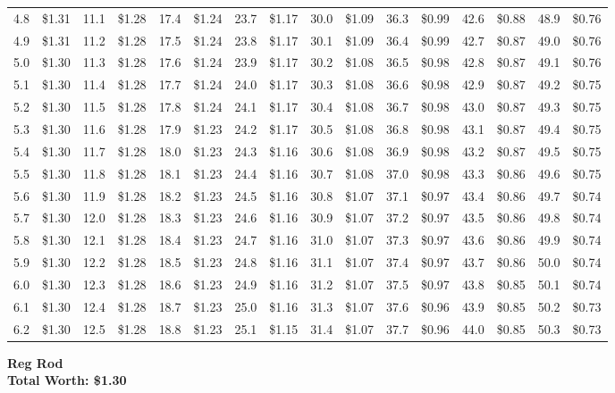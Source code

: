 \documentclass{article}
\begin{document}
\begin{tabular}{|*{8}{rr|}}
4.8 & \$1.31 & 11.1 & \$1.28 & 17.4 & \$1.24 & 23.7 & \$1.17 & 30.0 & \$1.09 & 36.3 & \$0.99 & 42.6 & \$0.88 & 48.9 & \$0.76\\
4.9 & \$1.31 & 11.2 & \$1.28 & 17.5 & \$1.24 & 23.8 & \$1.17 & 30.1 & \$1.09 & 36.4 & \$0.99 & 42.7 & \$0.87 & 49.0 & \$0.76\\
5.0 & \$1.30 & 11.3 & \$1.28 & 17.6 & \$1.24 & 23.9 & \$1.17 & 30.2 & \$1.08 & 36.5 & \$0.98 & 42.8 & \$0.87 & 49.1 & \$0.76\\
5.1 & \$1.30 & 11.4 & \$1.28 & 17.7 & \$1.24 & 24.0 & \$1.17 & 30.3 & \$1.08 & 36.6 & \$0.98 & 42.9 & \$0.87 & 49.2 & \$0.75\\
5.2 & \$1.30 & 11.5 & \$1.28 & 17.8 & \$1.24 & 24.1 & \$1.17 & 30.4 & \$1.08 & 36.7 & \$0.98 & 43.0 & \$0.87 & 49.3 & \$0.75\\
5.3 & \$1.30 & 11.6 & \$1.28 & 17.9 & \$1.23 & 24.2 & \$1.17 & 30.5 & \$1.08 & 36.8 & \$0.98 & 43.1 & \$0.87 & 49.4 & \$0.75\\
5.4 & \$1.30 & 11.7 & \$1.28 & 18.0 & \$1.23 & 24.3 & \$1.16 & 30.6 & \$1.08 & 36.9 & \$0.98 & 43.2 & \$0.87 & 49.5 & \$0.75\\
5.5 & \$1.30 & 11.8 & \$1.28 & 18.1 & \$1.23 & 24.4 & \$1.16 & 30.7 & \$1.08 & 37.0 & \$0.98 & 43.3 & \$0.86 & 49.6 & \$0.75\\
5.6 & \$1.30 & 11.9 & \$1.28 & 18.2 & \$1.23 & 24.5 & \$1.16 & 30.8 & \$1.07 & 37.1 & \$0.97 & 43.4 & \$0.86 & 49.7 & \$0.74\\
5.7 & \$1.30 & 12.0 & \$1.28 & 18.3 & \$1.23 & 24.6 & \$1.16 & 30.9 & \$1.07 & 37.2 & \$0.97 & 43.5 & \$0.86 & 49.8 & \$0.74\\
5.8 & \$1.30 & 12.1 & \$1.28 & 18.4 & \$1.23 & 24.7 & \$1.16 & 31.0 & \$1.07 & 37.3 & \$0.97 & 43.6 & \$0.86 & 49.9 & \$0.74\\
5.9 & \$1.30 & 12.2 & \$1.28 & 18.5 & \$1.23 & 24.8 & \$1.16 & 31.1 & \$1.07 & 37.4 & \$0.97 & 43.7 & \$0.86 & 50.0 & \$0.74\\
6.0 & \$1.30 & 12.3 & \$1.28 & 18.6 & \$1.23 & 24.9 & \$1.16 & 31.2 & \$1.07 & 37.5 & \$0.97 & 43.8 & \$0.85 & 50.1 & \$0.74\\
6.1 & \$1.30 & 12.4 & \$1.28 & 18.7 & \$1.23 & 25.0 & \$1.16 & 31.3 & \$1.07 & 37.6 & \$0.96 & 43.9 & \$0.85 & 50.2 & \$0.73\\
6.2 & \$1.30 & 12.5 & \$1.28 & 18.8 & \$1.23 & 25.1 & \$1.15 & 31.4 & \$1.07 & 37.7 & \$0.96 & 44.0 & \$0.85 & 50.3 & \$0.73\\

\end{tabular}
\clearpage
{\large\bf Reg Rod\\Total Worth: \$1.30}
\end{document}
